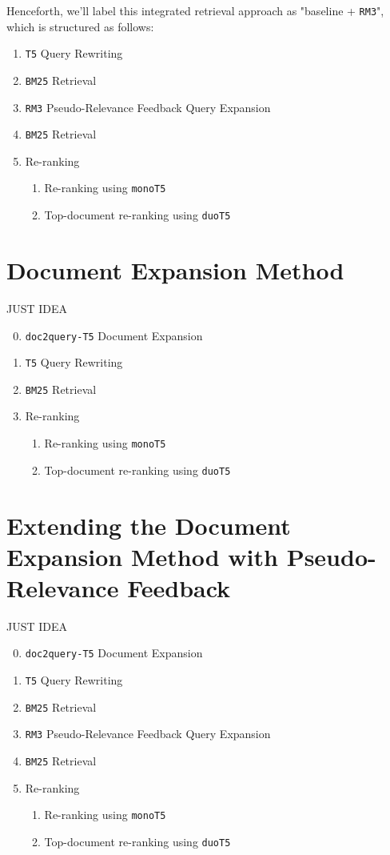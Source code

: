 \documentclass[sigconf]{acmart}
\begin{document}
Henceforth, we'll label this integrated retrieval approach as "baseline + \texttt{RM3}", which is structured as follows:
\begin{enumerate}
	\item	\texttt{T5} Query Rewriting
	\item	\texttt{BM25} Retrieval
	\item	\texttt{RM3} Pseudo-Relevance Feedback Query Expansion
	\item	\texttt{BM25} Retrieval
	\item	Re-ranking
			\begin{enumerate}
				\item	Re-ranking using \texttt{monoT5}
				\item	Top-document re-ranking using \texttt{duoT5}
			\end{enumerate}
\end{enumerate}

\section{Document Expansion Method}
JUST IDEA
\begin{enumerate}
	\setcounter{enumi}{-1}
	\item	\texttt{doc2query-T5} Document Expansion
	\item	\texttt{T5} Query Rewriting
	\item	\texttt{BM25} Retrieval
	\item	Re-ranking
			\begin{enumerate}
				\item	Re-ranking using \texttt{monoT5}
				\item	Top-document re-ranking using \texttt{duoT5}
			\end{enumerate}
\end{enumerate}

\section{Extending the Document Expansion Method with Pseudo-Relevance Feedback}
JUST IDEA
\begin{enumerate}
	\setcounter{enumi}{-1}
	\item	\texttt{doc2query-T5} Document Expansion
	\item	\texttt{T5} Query Rewriting
	\item	\texttt{BM25} Retrieval
	\item	\texttt{RM3} Pseudo-Relevance Feedback Query Expansion
	\item	\texttt{BM25} Retrieval
	\item	Re-ranking
			\begin{enumerate}
				\item	Re-ranking using \texttt{monoT5}
				\item	Top-document re-ranking using \texttt{duoT5}
			\end{enumerate}
\end{enumerate}
\end{document}
